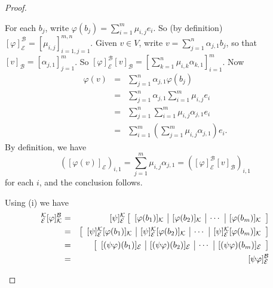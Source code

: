 \documentclass{memoir}
\begin{document}
\begin{proof} \mbox{}
\begin{enumerate*}
\item For each $b_j$, write $\varphi(b_j) = \sum_{i=1}^m \mu_{i,j} e_i$. So (by definition) $[\varphi]^\mathcal{B}_\mathcal{E} = [\mu_{i,j}]_{i=1,j=1}^{m,n}$. Given $v \in V$, write $v = \sum_{j=1}^n \alpha_{j,1} b_j$, so that $[v]_\mathcal{B} = [\alpha_{j,1}]_{j=1}^m$. So $[\varphi]^\mathcal{B}_\mathcal{E} [v]_\mathcal{B} = [\sum_{k=1}^n \mu_{i,k} \alpha_{k,1}]_{i=1}^m$. Now
\begin{eqnarray*}
\varphi(v) & = & \sum_{j=1}^n \alpha_{j,1} \varphi(b_j) \\
 & = & \sum_{j=1}^n \alpha_{j,1} \sum_{i=1}^m \mu_{i,j} e_i \\
 & = & \sum_{j=1}^n \sum_{i=1}^m \mu_{i,j} \alpha_{j,1} e_i \\
 & = & \sum_{i=1}^m \left( \sum_{j=1}^m \mu_{i,j} \alpha_{j,1} \right) e_i.
\end{eqnarray*}
By definition, we have \[ \left( [\varphi(v)]_\mathcal{E} \right)_{i,1} = \sum_{j=1}^m \mu_{i,j} \alpha_{j,1} = \left( [\varphi]^\mathcal{B}_\mathcal{E} [v]_\mathcal{B} \right)_{i,1} \] for each $i$, and the conclusion follows.
\item Using (i) we have
\begin{eqnarray*}
[\psi]^\mathcal{K}_\mathcal{E} [\varphi]^\mathcal{B}_\mathcal{K} & = & [\psi]^\mathcal{K}_\mathcal{E} \left[\begin{array}{c|c|c|c} [\varphi(b_1)]_\mathcal{K} & [\varphi(b_2)]_\mathcal{K} & \cdots & [\varphi(b_m)]_\mathcal{K} \end{array}\right] \\
 & = & \left[\begin{array}{c|c|c|c} [\psi]^\mathcal{K}_\mathcal{E} [\varphi(b_1)]_\mathcal{K} & [\psi]^\mathcal{K}_\mathcal{E} [\varphi(b_2)]_\mathcal{K} & \cdots & [\psi]^\mathcal{K}_\mathcal{E} [\varphi(b_m)]_\mathcal{K} \end{array}\right] \\
 & = & \left[\begin{array}{c|c|c|c} [(\psi\varphi)(b_1)]_\mathcal{E} & [(\psi\varphi)(b_2)]_\mathcal{E} & \cdots & [(\psi\varphi)(b_m)]_\mathcal{E} \end{array}\right] \\
 & = & [\psi\varphi]^\mathcal{B}_\mathcal{E} \qedhere
\end{eqnarray*}
\end{enumerate*}
\end{proof}
\end{document}
